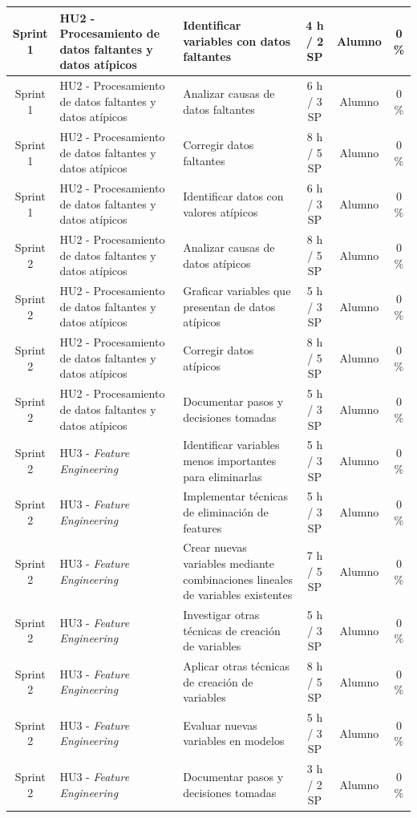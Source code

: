 \documentclass[
11pt, %
]{charter}
\begin{document}
\begin{xltabular}{\linewidth}{@{}|c|X|X|c|c|c|@{}}
Sprint 1 & HU2 - Procesamiento de datos faltantes y datos atípicos & Identificar variables con datos faltantes  & 4 h / 2 SP & Alumno & 0 \%\\ \hline
Sprint 1 & HU2 - Procesamiento de datos faltantes y datos atípicos & Analizar causas de datos faltantes  & 6 h / 3 SP & Alumno & 0 \%\\ \hline
Sprint 1 & HU2 - Procesamiento de datos faltantes y datos atípicos & Corregir datos faltantes  & 8 h / 5 SP & Alumno & 0 \%\\ \hline
Sprint 1 & HU2 - Procesamiento de datos faltantes y datos atípicos & Identificar datos con valores atípicos  & 6 h / 3 SP & Alumno & 0 \%\\ \hline
Sprint 2 & HU2 - Procesamiento de datos faltantes y datos atípicos & Analizar causas de datos atípicos  & 8 h / 5 SP & Alumno & 0 \%\\ \hline
Sprint 2 & HU2 - Procesamiento de datos faltantes y datos atípicos & Graficar variables que presentan de datos atípicos  & 5 h / 3 SP & Alumno & 0 \% \\ \hline
Sprint 2 & HU2 - Procesamiento de datos faltantes y datos atípicos & Corregir datos atípicos  & 8 h / 5 SP & Alumno & 0 \%\\ \hline
Sprint 2 & HU2 - Procesamiento de datos faltantes y datos atípicos & Documentar pasos y decisiones tomadas  & 5 h / 3 SP & Alumno & 0 \% \\ \hline
Sprint 2 & HU3 - \textit{Feature Engineering}  & Identificar variables menos importantes para eliminarlas  & 5 h / 3 SP & Alumno & 0 \%\\ \hline
Sprint 2 & HU3 - \textit{Feature Engineering}  & Implementar técnicas de eliminación de features  & 5 h / 3 SP & Alumno & 0 \% \\ \hline
Sprint 2 & HU3 - \textit{Feature Engineering}  & Crear nuevas variables mediante combinaciones lineales de variables existentes  & 7 h / 5 SP & Alumno & 0 \%\\ \hline
Sprint 2 & HU3 - \textit{Feature Engineering}  & Investigar otras técnicas de creación de variables & 5 h / 3 SP & Alumno & 0 \% \\ \hline
Sprint 2 & HU3 - \textit{Feature Engineering}  & Aplicar otras técnicas de creación de variables  & 8 h / 5 SP & Alumno & 0 \%\\ \hline
Sprint 2 & HU3 - \textit{Feature Engineering}  & Evaluar nuevas variables en modelos  & 5 h / 3 SP & Alumno & 0 \%\\ \hline
Sprint 2 & HU3 - \textit{Feature Engineering}  & Documentar pasos y decisiones tomadas  & 3 h / 2 SP & Alumno & 0 \%\\ \hline

\end{xltabular}
\end{document}
